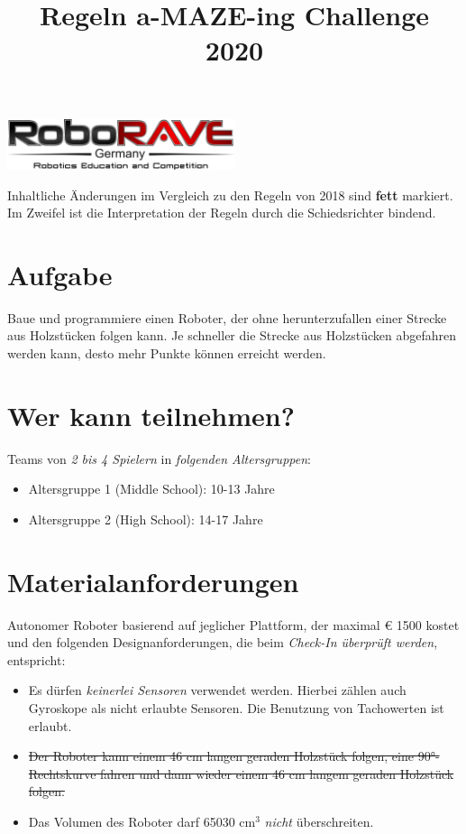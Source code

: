 \documentclass[a4paper,12pt]{article}
\begin{document}
\title{Regeln a-MAZE-ing Challenge 2020}
\makeatletter
\let\inserttitle\@title
\makeatother

 \begin{center}
\includegraphics[width=0.5\textwidth]{logo.png}

\huge                      %
\bfseries                   %
\inserttitle
  \end{center}
  Inhaltliche Änderungen im Vergleich zu den Regeln von 2018 sind \textbf{fett} markiert. Im Zweifel ist die Interpretation der Regeln durch die Schiedsrichter bindend.
\section{Aufgabe}
Baue und programmiere einen Roboter, der ohne herunterzufallen einer Strecke aus Holzstücken folgen
kann. Je schneller die Strecke aus Holzstücken abgefahren werden kann, desto mehr Punkte können erreicht
werden.
\section{Wer kann teilnehmen?}
Teams von \emph{2 bis 4 Spielern} in \emph{folgenden Altersgruppen}:
\begin{itemize}
	\item Altersgruppe 1 (Middle School): 10-13 Jahre
	\item Altersgruppe 2 (High School): 14-17 Jahre
\end{itemize}
\section{Materialanforderungen}
Autonomer Roboter basierend auf jeglicher Plattform, der maximal  \euro{ 1500} kostet und den folgenden
Designanforderungen, die beim \emph{Check-In überprüft werden}, entspricht:
\begin{itemize}
\item Es dürfen \emph{keinerlei Sensoren} verwendet werden. Hierbei zählen auch Gyroskope als nicht erlaubte Sensoren. Die Benutzung von Tachowerten ist erlaubt.
\item \sout{Der Roboter kann einem 46 cm langen geraden Holzstück folgen, eine 90°-Rechtskurve fahren und dann wieder
einem 46 cm langem geraden Holzstück folgen.}
\item Das Volumen des Roboter darf 65030 cm$^{3}$ \emph{nicht} überschreiten.
\end{itemize}
\end{document}
